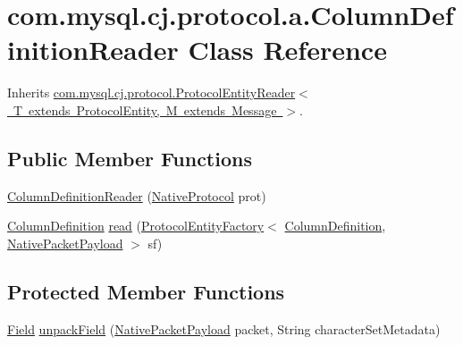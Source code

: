 \hypertarget{classcom_1_1mysql_1_1cj_1_1protocol_1_1a_1_1_column_definition_reader}{}\section{com.\+mysql.\+cj.\+protocol.\+a.\+Column\+Definition\+Reader Class Reference}
\label{classcom_1_1mysql_1_1cj_1_1protocol_1_1a_1_1_column_definition_reader}


Inherits \mbox{\hyperlink{interfacecom_1_1mysql_1_1cj_1_1protocol_1_1_protocol_entity_reader}{com.\+mysql.\+cj.\+protocol.\+Protocol\+Entity\+Reader$<$ T extends Protocol\+Entity, M extends Message $>$}}.

\subsection*{Public Member Functions}
\begin{DoxyCompactItemize}
\item 
\mbox{\hyperlink{classcom_1_1mysql_1_1cj_1_1protocol_1_1a_1_1_column_definition_reader_a8796691e9ca4bbf48f6f9d4b98cfa14c}{Column\+Definition\+Reader}} (\mbox{\hyperlink{classcom_1_1mysql_1_1cj_1_1protocol_1_1a_1_1_native_protocol}{Native\+Protocol}} prot)
\item 
\mbox{\hyperlink{interfacecom_1_1mysql_1_1cj_1_1protocol_1_1_column_definition}{Column\+Definition}} \mbox{\hyperlink{classcom_1_1mysql_1_1cj_1_1protocol_1_1a_1_1_column_definition_reader_a1655d4c72f8e621876807e32a501eadc}{read}} (\mbox{\hyperlink{interfacecom_1_1mysql_1_1cj_1_1protocol_1_1_protocol_entity_factory}{Protocol\+Entity\+Factory}}$<$ \mbox{\hyperlink{interfacecom_1_1mysql_1_1cj_1_1protocol_1_1_column_definition}{Column\+Definition}}, \mbox{\hyperlink{classcom_1_1mysql_1_1cj_1_1protocol_1_1a_1_1_native_packet_payload}{Native\+Packet\+Payload}} $>$ sf)
\end{DoxyCompactItemize}
\subsection*{Protected Member Functions}
\begin{DoxyCompactItemize}
\item 
\mbox{\hyperlink{classcom_1_1mysql_1_1cj_1_1result_1_1_field}{Field}} \mbox{\hyperlink{classcom_1_1mysql_1_1cj_1_1protocol_1_1a_1_1_column_definition_reader_a544a33df60bf2153e61c6c743e3aefd7}{unpack\+Field}} (\mbox{\hyperlink{classcom_1_1mysql_1_1cj_1_1protocol_1_1a_1_1_native_packet_payload}{Native\+Packet\+Payload}} packet, String character\+Set\+Metadata)
\end{DoxyCompactItemize}


